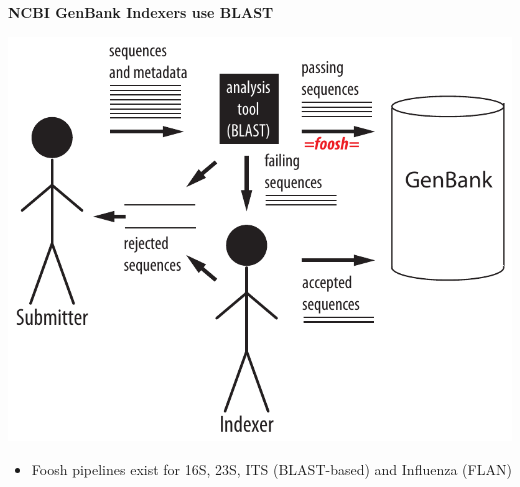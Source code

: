 \documentclass[landscape]{slides}
\begin{document}
\begin{slide}
\begin{center}
\textbf{NCBI GenBank Indexers use BLAST}

\includegraphics[width=7in]{figs/submission-schematic-3}

\small
\begin{itemize}
\item Foosh pipelines exist for 16S, 23S, ITS (BLAST-based) and
    Influenza (FLAN)
\end{itemize}

\vfill
\end{center}
\end{slide}
\end{document}
